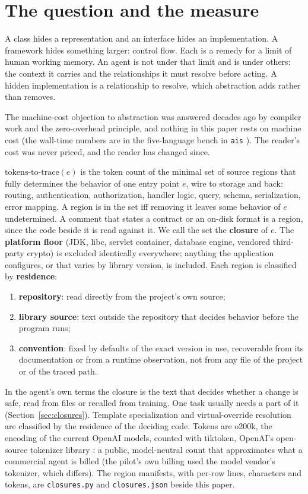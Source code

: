 \documentclass[journal]{IEEEtran}
\begin{document}
\section{The question and the measure}
\label{sec:measure}

A class hides a representation and an interface hides an implementation.
A framework hides something larger: control flow. Each is a remedy for a limit of human working
memory. An agent is not under that limit and is under others: the context it
carries and the relationships it must resolve before acting. A hidden
implementation is a relationship to resolve, which abstraction adds rather
than removes.

The machine-cost objection to abstraction was answered decades ago by
compiler work and the zero-overhead principle, and nothing in this paper
rests on machine cost (the wall-time numbers are in the
five-language bench in \texttt{ais} \cite{ais}). The reader's cost was never
priced, and the reader has changed since.

$\mathrm{tokens\mbox{-}to\mbox{-}trace}(e)$ is the token count of the minimal
set of source regions that fully determines the behavior of one entry point
$e$, wire to storage and back: routing, authentication, authorization, handler
logic, query, schema, serialization, error mapping. A region is in the set iff
removing it leaves some behavior of $e$ undetermined. A comment that
states a contract or an on-disk format is a region, since the code
beside it is read against it. We call the set the
\textbf{closure} of $e$. The \textbf{platform floor} (JDK,
libc, servlet container, database engine, vendored third-party crypto) is
excluded identically everywhere; anything the application configures, or that
varies by library version, is included. Each region is classified by
\textbf{residence}:

\begin{enumerate}[nosep]
\item \textbf{repository}: read directly from the project's own source;
\item \textbf{library source}: text outside the repository that decides
behavior before the program runs;
\item \textbf{convention}: fixed by defaults of the exact version in use,
recoverable from its documentation or from a runtime observation, not from
any file of the project or of the traced path.
\end{enumerate}

In the agent's own terms the closure is the text that decides whether a
change is safe, read from files or recalled from training. One task
usually needs a part of it (Section~\ref{sec:closures}). Template
specialization and virtual-override resolution are classified by the
residence of the deciding code. Tokens are o200k, the encoding of the current OpenAI models, counted with
tiktoken, OpenAI's open-source tokenizer library \cite{tiktoken}: a public,
model-neutral count that approximates what a commercial agent is billed (the
pilot's own billing used the model vendor's tokenizer, which differs). The region manifests, with per-row lines, characters and
tokens, are \texttt{closures.py} and \texttt{closures.json} beside this
paper.
\end{document}
